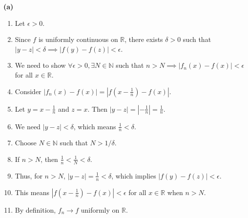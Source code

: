 \documentclass{article}
\newcommand{\R}{\mathbb{R}}
\newcommand{\N}{\mathbb{N}}
\newcommand{\abs}[1]{\left|#1\right|}
\begin{document}
\textbf{(a)}
\begin{enumerate}
    \item Let \(\epsilon > 0\).
    \item Since \(f\) is uniformly continuous on \(\R\), there exists \(\delta > 0\) such that \(\abs{y - z} < \delta \implies \abs{f(y) - f(z)} < \epsilon\).
    \item We need to show \(\forall \epsilon > 0, \exists N \in \N\) such that \(n > N \implies \abs{f_n(x) - f(x)} < \epsilon\) for all \(x \in \R\).
    \item Consider \(\abs{f_n(x) - f(x)} = \abs{f(x - \tfrac{1}{n}) - f(x)}\).
    \item Let \(y = x - \tfrac{1}{n}\) and \(z = x\). Then \(\abs{y - z} = \abs{-\tfrac{1}{n}} = \tfrac{1}{n}\).
    \item We need \(\abs{y - z} < \delta\), which means \(\tfrac{1}{n} < \delta\).
    \item Choose \(N \in \N\) such that \(N > 1/\delta\).
    \item If \(n > N\), then \(\tfrac{1}{n} < \tfrac{1}{N} < \delta\).
    \item Thus, for \(n > N\), \(\abs{y - z} = \tfrac{1}{n} < \delta\), which implies \(\abs{f(y) - f(z)} < \epsilon\).
    \item This means \(\abs{f(x - \tfrac{1}{n}) - f(x)} < \epsilon\) for all \(x \in \R\) when \(n > N\).
    \item By definition, \(f_n \to f\) uniformly on \(\R\).
\end{enumerate}
\end{document}
